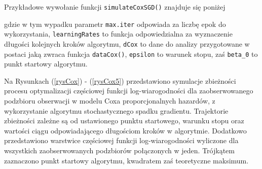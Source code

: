 Przykładowe wywołanie funkcji \texttt{simulateCoxSGD()} znajduje się poniżej

\begin{Shaded}
\begin{Highlighting}[]
 \NormalTok{/(}\NormalTok{*}
                \NormalTok{, } \NormalTok{, } \NormalTok{(}\NormalTok{,}\NormalTok{))}
\end{Highlighting}
\end{Shaded}
gdzie w tym wypadku parametr \texttt{max.iter} odpowiada za liczbę epok do wykorzystania, \texttt{learningRates} to funkcja odpowiedzialna za wyznaczenie długości kolejnych kroków algorytmu, \texttt{dCox} to dane do analizy przygotowane w postaci jaką zwraca funkcja \texttt{dataCox()}, \texttt{epsilon} to warunek stopu, zaś \texttt{beta\_0} to punkt startowy algorytmu.

Na Rysunkach (\ref{rysCox}) - (\ref{rysCox5}) przedstawiono symulacje zbieżności procesu optymalizacji częściowej funkcji log-wiarogodności dla zaobserwowanego podzbioru obserwacji w modelu Coxa proporcjonalnych hazardów, z wykorzystanie algorytmu stochastycznego spadku gradientu. Trajektorie zbieżności zależne są od ustawionego punktu startowego, warunku stopu oraz wartości ciągu odpowiadającego długościom kroków w algorytmie. Dodatkowo przedstawiono warstwice częściowej funkcji log-wiarogodności wyliczone dla wszystkich zaobserwowanych podzbiorów połączonych w jeden. Trójkątem zaznaczono punkt startowy algorytmu, kwadratem zaś teoretyczne maksimum. 

